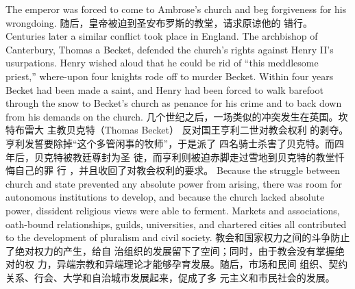 \begin{paracol}{2}
\switchcolumn*
The emperor was forced to come to Ambrose's church and beg
forgiveness for his wrongdoing.
\switchcolumn
随后，皇帝被迫到圣安布罗斯的教堂，请求原谅他的
错行。
\switchcolumn*
Centuries later a similar conflict took place in England. The
archbishop of Canterbury, Thomas a Becket, defended the
church's rights against Henry II's usurpations. Henry wished
aloud that he could be rid of ``this meddlesome priest,'' where-upon four knights rode off to murder Becket. Within four years
Becket had been made a saint, and Henry had been forced to
walk barefoot through the snow to Becket's church as penance
for his crime and to back down from his demands on the
church.
\switchcolumn
几个世纪之后，一场类似的冲突发生在英国。坎特布雷大
主教贝克特（Thomas Becket） 反对国王亨利二世对教会权利
的剥夺。亨利发誓要除掉“这个多管闲事的牧师”，于是派了
四名骑士杀害了贝克特。而四年后，贝克特被教廷尊封为圣
徒，而亨利则被迫赤脚走过雪地到贝克特的教堂忏悔自己的罪
行 ，并且收回了对教会权利的要求。
\switchcolumn*
Because the struggle between church and state prevented
any absolute power from arising, there was room for autonomous institutions to develop, and because the church
lacked absolute power, dissident religious views were able to ferment. Markets and associations, oath-bound relationships,
guilds, universities, and chartered cities all contributed to the
development of pluralism and civil society.
\switchcolumn
教会和国家权力之间的斗争防止了绝对权力的产生，给自
治组织的发展留下了空间；同时，由于教会没有掌握绝对的权
力，异端宗教和异端理论才能够孕育发展。随后，市场和民间
组织、契约关系、行会、大学和自治城市发展起来，促成了多
元主义和市民社会的发展。


\end{paracol}
